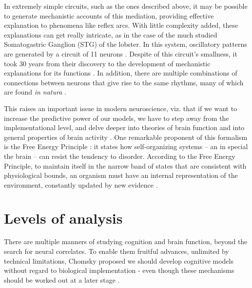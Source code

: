     In extremely simple circuits, such as the ones described above, it may be possible to generate mechanistic accounts of this mediation, providing effective explanation to phenomena like reflex arcs. With little complexity added, these explanations can get really intricate, as in the case of the much studied Somatogastric Ganglion (STG) of the lobster. In this system, oscillatory patterns are generated by a circuit of 11 neurons \cite{selverston2009neural}. Despite of this circuit's smallness, it took 30 years from their discovery to the development of mechanistic explanations for its functions \cite{bal1988pyloric, selverston2009neural}. In addition, there are multiple combinations of connections between neurons that give rise to the same rhythms, many of which are found \textit{in natura} \cite{prinz2004similar}. 
    
    
    This raises an important issue in modern neuroscience, viz. that if we want to increase the predictive power of our models, we have to step away from the implementational level, and delve deeper into theories of brain function and into general properties of brain activity \cite{gerstner2012theory}. One remarkable proponent of this formalism is the Free Energy Principle \cite{friston2009free}: it states how self-organizing systems -- an in special the brain -- can resist the tendency to disorder. According to the Free Energy Principle, to maintain itself in the narrow band of states that are consistent with physiological bounds, an organism must have an internal representation of the environment, constantly updated by new evidence \cite{friston2009free}.
    
\section{Levels of analysis}
    There are multiple manners of studying cognition and brain function, beyond the search for neural correlates. To enable them fruitful advances, unlimited by technical limitations, Chomsky proposed we should develop cognitive models without regard to biological implementation - even though these mechanisms should be worked out at a later stage \cite[p.~12]{chomsky2006language}.

